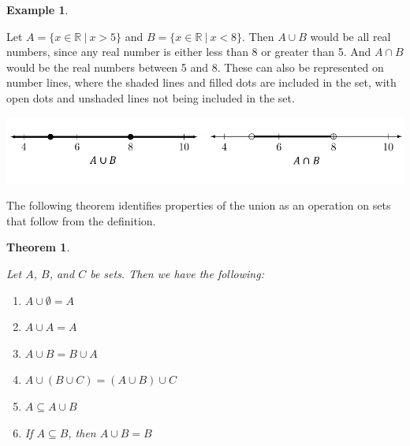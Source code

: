 \documentclass[
]{book}
\newtheorem{theorem}{Theorem}[chapter]
\theoremstyle{definition}
\theoremstyle{definition}
\newtheorem{example}{Example}[chapter]
\theoremstyle{definition}
\theoremstyle{definition}
\theoremstyle{remark}
\begin{document}
\begin{example}
\protect\hypertarget{exm:unlabeled-div-11}{}\label{exm:unlabeled-div-11}

Let \(A = \{ x\in \mathbb{R} \: \vert \: x > 5\}\) and \(B=\{x \in \mathbb{R} \: \vert \: x < 8\}\). Then \(A\cup B\) would be all real numbers, since any real number is either less than 8 or greater than 5. And \(A\cap B\) would be the real numbers between 5 and 8. These can also be represented on number lines, where the shaded lines and filled dots are included in the set, with open dots and unshaded lines not being included in the set.

\begin{center}\includegraphics[width=0.95\linewidth]{tikz/number-line-unions} \end{center}

\end{example}

The following theorem identifies properties of the union as an operation on sets that follow from the definition.

\begin{theorem}
\protect\hypertarget{thm:unlabeled-div-12}{}\label{thm:unlabeled-div-12}

Let \(A\), \(B\), and \(C\) be sets. Then we have the following:

\begin{enumerate}
\def\labelenumi{\arabic{enumi}.}
\item
  \(A\cup \emptyset = A\)
\item
  \(A \cup A = A\)
\item
  \(A \cup B = B \cup A\)
\item
  \(A \cup (B\cup C ) = (A\cup B) \cup C\)
\item
  \(A \subseteq A \cup B\)
\item
  If \(A \subseteq B\), then \(A\cup B=B\)
\end{enumerate}

\end{theorem}
\end{document}
